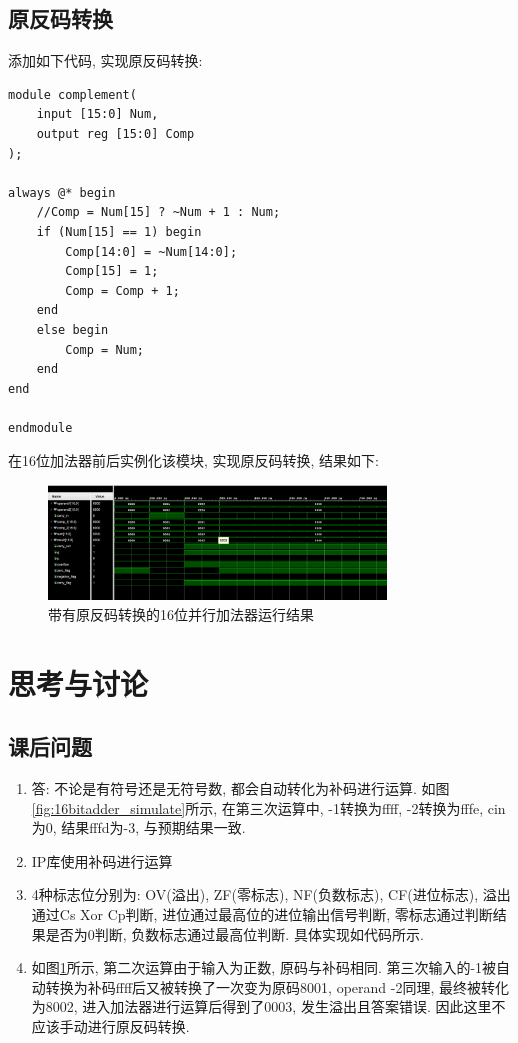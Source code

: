 \documentclass[AutoFakeBold]{LZUThesis}
\begin{document}
\section{原反码转换}

添加如下代码, 实现原反码转换:
    \begin{lstlisting}
module complement(
    input [15:0] Num,
    output reg [15:0] Comp
);

always @* begin
    //Comp = Num[15] ? ~Num + 1 : Num;
    if (Num[15] == 1) begin
        Comp[14:0] = ~Num[14:0];
        Comp[15] = 1;
        Comp = Comp + 1;
    end
    else begin
        Comp = Num;
    end
end

endmodule
    \end{lstlisting}
在16位加法器前后实例化该模块, 实现原反码转换, 结果如下:

    \begin{figure}[htbp]
        \centering
        \includegraphics[width=0.8\textwidth]{./img/16bitadderwithcomplement}
        \caption{带有原反码转换的16位并行加法器运行结果}
        \label{fig:16bitadderwithcomplement}
    \end{figure}

\chapter{思考与讨论}
\section{课后问题}
\begin{enumerate}
    \item 答: 不论是有符号还是无符号数, 都会自动转化为补码进行运算. 
    如图\ref{fig:16bitadder_simulate}所示, 在第三次运算中, -1转换为ffff, -2转换为fffe, cin为0, 结果fffd为-3, 与预期结果一致.
    \item IP库使用补码进行运算
    \item 4种标志位分别为: OV(溢出), ZF(零标志), NF(负数标志), CF(进位标志), 
    溢出通过Cs Xor Cp判断, 进位通过最高位的进位输出信号判断, 零标志通过判断结果是否为0判断, 负数标志通过最高位判断.
    具体实现如代码所示.
    \item 如图\ref{fig:16bitadderwithcomplement}所示, 第二次运算由于输入为正数, 原码与补码相同. 
    第三次输入的-1被自动转换为补码ffff后又被转换了一次变为原码8001, operand -2同理, 最终被转化为8002, 进入加法器进行运算后得到了0003, 发生溢出且答案错误.
    因此这里不应该手动进行原反码转换.
\end{enumerate}
\end{document}
